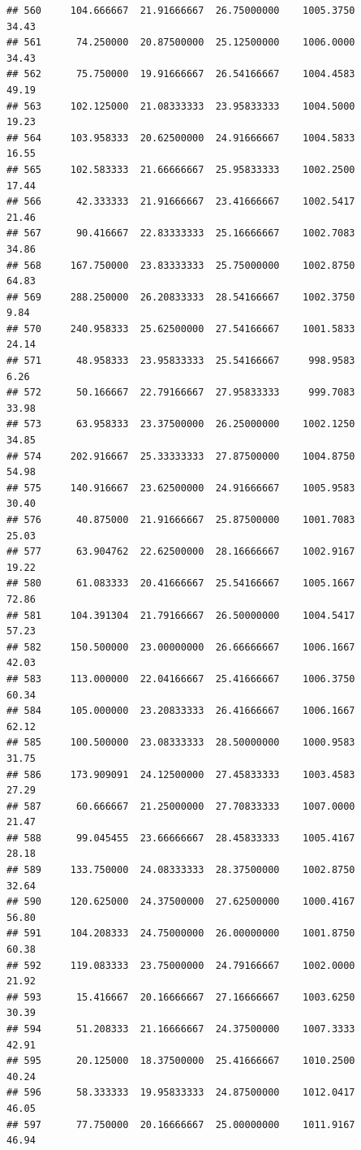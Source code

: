 \documentclass[
]{article}
\begin{document}
\begin{verbatim}
## 560     104.666667  21.91666667  26.75000000    1005.3750       34.43
## 561      74.250000  20.87500000  25.12500000    1006.0000       34.43
## 562      75.750000  19.91666667  26.54166667    1004.4583       49.19
## 563     102.125000  21.08333333  23.95833333    1004.5000       19.23
## 564     103.958333  20.62500000  24.91666667    1004.5833       16.55
## 565     102.583333  21.66666667  25.95833333    1002.2500       17.44
## 566      42.333333  21.91666667  23.41666667    1002.5417       21.46
## 567      90.416667  22.83333333  25.16666667    1002.7083       34.86
## 568     167.750000  23.83333333  25.75000000    1002.8750       64.83
## 569     288.250000  26.20833333  28.54166667    1002.3750        9.84
## 570     240.958333  25.62500000  27.54166667    1001.5833       24.14
## 571      48.958333  23.95833333  25.54166667     998.9583        6.26
## 572      50.166667  22.79166667  27.95833333     999.7083       33.98
## 573      63.958333  23.37500000  26.25000000    1002.1250       34.85
## 574     202.916667  25.33333333  27.87500000    1004.8750       54.98
## 575     140.916667  23.62500000  24.91666667    1005.9583       30.40
## 576      40.875000  21.91666667  25.87500000    1001.7083       25.03
## 577      63.904762  22.62500000  28.16666667    1002.9167       19.22
## 580      61.083333  20.41666667  25.54166667    1005.1667       72.86
## 581     104.391304  21.79166667  26.50000000    1004.5417       57.23
## 582     150.500000  23.00000000  26.66666667    1006.1667       42.03
## 583     113.000000  22.04166667  25.41666667    1006.3750       60.34
## 584     105.000000  23.20833333  26.41666667    1006.1667       62.12
## 585     100.500000  23.08333333  28.50000000    1000.9583       31.75
## 586     173.909091  24.12500000  27.45833333    1003.4583       27.29
## 587      60.666667  21.25000000  27.70833333    1007.0000       21.47
## 588      99.045455  23.66666667  28.45833333    1005.4167       28.18
## 589     133.750000  24.08333333  28.37500000    1002.8750       32.64
## 590     120.625000  24.37500000  27.62500000    1000.4167       56.80
## 591     104.208333  24.75000000  26.00000000    1001.8750       60.38
## 592     119.083333  23.75000000  24.79166667    1002.0000       21.92
## 593      15.416667  20.16666667  27.16666667    1003.6250       30.39
## 594      51.208333  21.16666667  24.37500000    1007.3333       42.91
## 595      20.125000  18.37500000  25.41666667    1010.2500       40.24
## 596      58.333333  19.95833333  24.87500000    1012.0417       46.05
## 597      77.750000  20.16666667  25.00000000    1011.9167       46.94

\end{verbatim}
\end{document}
